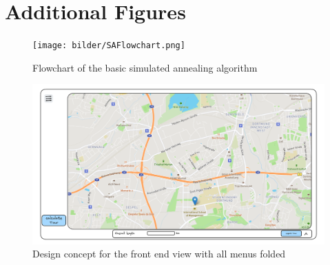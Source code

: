 \section{Additional Figures}



\begin{figure}
\texttt{[image: bilder/SAFlowchart.png]}
\caption{Flowchart of the basic simulated annealing algorithm}
\label{fig:SAFlowchart}
\end{figure}




\begin{figure}[H]
	\includegraphics[width=0.9\linewidth]{bilder/Concept burger menu and stats hidden.png}
	\caption{Design concept for the front end view with all menus folded}
	\label{fig:frontendConceptMenusClosed}
\end{figure}


